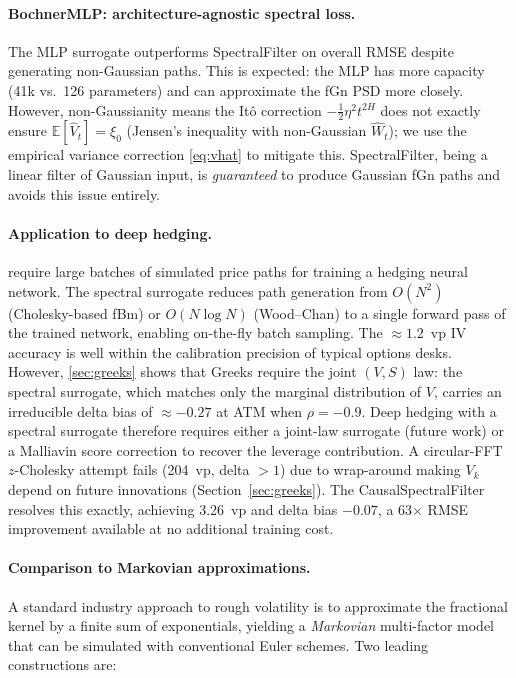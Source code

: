 \documentclass[11pt,a4paper]{article}
\newcommand{\E}{\mathbb{E}}
\begin{document}
\paragraph{BochnerMLP: architecture-agnostic spectral loss.}
The MLP surrogate outperforms SpectralFilter on overall RMSE despite
generating non-Gaussian paths. This is expected: the MLP has more
capacity (41k vs.\ 126 parameters) and can approximate the fGn PSD more
closely. However, non-Gaussianity means the Itô correction
$-\frac{1}{2}\eta^2 t^{2H}$ does not exactly ensure $\E[\hat{V}_t] =
\xi_0$ (Jensen's inequality with non-Gaussian $\hat{W}_t$); we use the
empirical variance correction \eqref{eq:vhat} to mitigate this.
SpectralFilter, being a linear filter of Gaussian input, is
\emph{guaranteed} to produce Gaussian fGn paths and avoids this issue
entirely.

\paragraph{Application to deep hedging.}
\citet{buhler2019deep} require large batches of simulated price paths for
training a hedging neural network. The spectral surrogate reduces
path generation from $O(N^2)$ (Cholesky-based fBm) or $O(N \log N)$
(Wood--Chan) to a single forward pass of the trained network, enabling
on-the-fly batch sampling. The $\approx 1.2$~vp IV accuracy is well
within the calibration precision of typical options desks.
However, \cref{sec:greeks} shows that Greeks require the joint $(V, S)$
law: the spectral surrogate, which matches only the marginal distribution
of $V$, carries an irreducible delta bias of $\approx -0.27$ at ATM
when $\rho = -0.9$. Deep hedging with a spectral surrogate therefore
requires either a joint-law surrogate (future work) or a Malliavin
score correction to recover the leverage contribution. A circular-FFT $z$-Cholesky attempt fails (204~vp, delta $>1$) due to
wrap-around making $V_k$ depend on future innovations
(Section~\ref{sec:greeks}). The CausalSpectralFilter resolves this
exactly, achieving 3.26~vp and delta bias $-0.07$, a 63$\times$ RMSE
improvement available at no additional training cost.

\paragraph{Comparison to Markovian approximations.}
A standard industry approach to rough volatility is to approximate the
fractional kernel by a finite sum of exponentials, yielding a
\emph{Markovian} multi-factor model that can be simulated with
conventional Euler schemes. Two leading constructions are:
\end{document}

